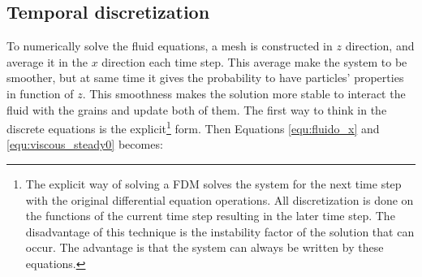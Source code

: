 \subsection{Temporal discretization}
\label{sec:discrete}
    To numerically solve the fluid equations, a mesh is constructed in $z$ direction, and average it in the $x$ direction each time step. This average make the system to be smoother, but at same time it gives the probability to have particles' properties in function of $z$. This smoothness makes the solution more stable to interact the fluid with the grains and update both of them. The first way to think in the discrete equations is the explicit\footnote{The explicit way of solving a FDM solves the system for the next time step with the original differential equation operations. All discretization is done on the functions of the current time step resulting in the later time step. The disadvantage of this technique is the instability factor of the solution that can occur. The advantage is that the system can always be written by these equations.} form. Then Equations \ref{equ:fluido_x} and \ref{equ:viscous_steady0} becomes:    
